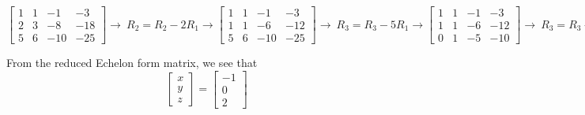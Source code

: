 \documentclass[a4paper]{report}
\begin{document}
$\left[\begin{array}{ccc|c}
1&1&-1& -3 \\
    2&3&-8&-18 \\
    5&6&-10&-25
\end{array}\right] \rightarrow\ R_2=R_2-2R_1\rightarrow\left [\begin{array}{ccc|c}
1&1&-1& -3 \\
    1&1&-6&-12 \\
    5&6&-10&-25
\end{array}\right] \rightarrow\ R_3=R_3-5R_1\rightarrow\left [\begin{array}{ccc|c}
1&1&-1& -3 \\
    1&1&-6&-12 \\
    0&1&-5&-10
\end{array}\right] \rightarrow\ R_3=R_3-R_2\rightarrow\left [\begin{array}{ccc|c}
1&1&-1& -3 \\
    1&1&-6&-12 \\
    0&0&1&2
\end{array} \right] \rightarrow\ R_1=R_1-R_2\rightarrow\left [\begin{array}{ccc|c}
1&0&5& 9 \\
    0&1&-6&-12 \\
    0&0&1&2
\end{array}\right] \rightarrow R_2=R_2+6R_3\rightarrow \left [\begin{array}{ccc|c}
1&0&5& 9 \\
    0&1&0&0 \\
    0&0&1&2
\end{array}\right] \rightarrow R_1=R_1-5R_3\rightarrow \left [\begin{array}{ccc|c}
1&0&0& -1 \\
    0&1&0&0 \\
    0&0&1&2
\end{array}\right]$

\vspace{10mm}

From the reduced Echelon form matrix, we see that 
\[\ \boxed{
\begin{bmatrix}
    x \\
    y \\
    z
\end{bmatrix} = \begin{bmatrix}
    -1 \\
    0 \\
    2
\end{bmatrix} }\]
\end{document}
